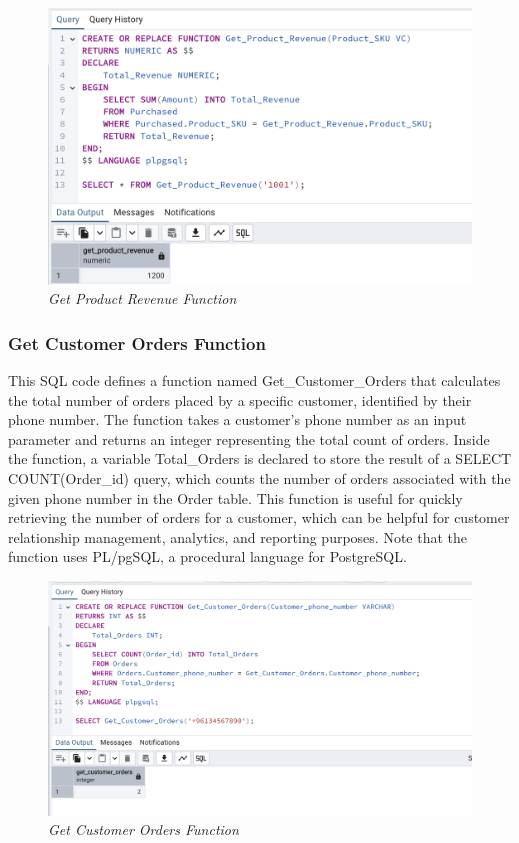 \begin{figure}[H]
  \centering
  \includegraphics[width=1\textwidth]{images/sql/functions/get_product_revenue.png}
  \caption{\textit{Get Product Revenue Function}}
\end{figure}

\subsubsection{Get Customer Orders Function}



This SQL code defines a function named Get\_Customer\_Orders that calculates the total number of orders placed by a specific customer, identified by their phone number. The function takes a customer's phone number as an input parameter and returns an integer representing the total count of orders. Inside the function, a variable Total\_Orders is declared to store the result of a SELECT COUNT(Order\_id) query, which counts the number of orders associated with the given phone number in the Order table. This function is useful for quickly retrieving the number of orders for a customer, which can be helpful for customer relationship management, analytics, and reporting purposes. Note that the function uses PL/pgSQL, a procedural language for PostgreSQL.

\begin{figure}[H]
  \centering
  \includegraphics[width=1\textwidth]{images/sql/functions/get_customer_orders.png}
  \caption{\textit{Get Customer Orders Function}}
\end{figure}

